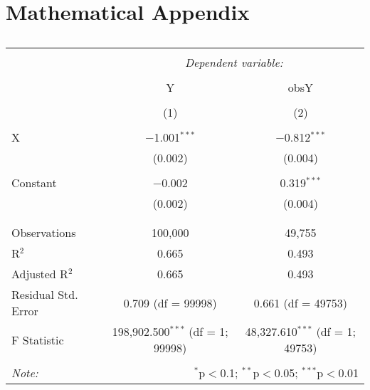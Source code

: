 \documentclass[12pt,english]{article}
\begin{document}
\pagebreak{}
\begin{spacing}{1.0}


\end{spacing}

\pagebreak{}

\appendix

\section{Mathematical Appendix}
\begin{table}[!htbp] \centering
  \caption{}
  \label{}
\begin{tabular}{@{\extracolsep{5pt}}lcc}
\\[-1.8ex]\hline
\hline \\[-1.8ex]
 & \multicolumn{2}{c}{\textit{Dependent variable:}} \\
\cline{2-3}
\\[-1.8ex] & Y & obsY \\
\\[-1.8ex] & (1) & (2)\\
\hline \\[-1.8ex]
 X & $-$1.001$^{***}$ & $-$0.812$^{***}$ \\
  & (0.002) & (0.004) \\
  & & \\
 Constant & $-$0.002 & 0.319$^{***}$ \\
  & (0.002) & (0.004) \\
  & & \\
\hline \\[-1.8ex]
Observations & 100,000 & 49,755 \\
R$^{2}$ & 0.665 & 0.493 \\
Adjusted R$^{2}$ & 0.665 & 0.493 \\
Residual Std. Error & 0.709 (df = 99998) & 0.661 (df = 49753) \\
F Statistic & 198,902.500$^{***}$ (df = 1; 99998) & 48,327.610$^{***}$ (df = 1; 49753) \\
\hline
\hline \\[-1.8ex]
\textit{Note:}  & \multicolumn{2}{r}{$^{*}$p$<$0.1; $^{**}$p$<$0.05; $^{***}$p$<$0.01} \\
\end{tabular}
\end{table}
\end{document}
